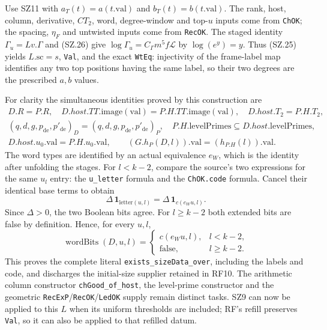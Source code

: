 Use SZ11 with $a_T(t)=a(t.\mathrm{val})$ and
$b_T(t)=b(t.\mathrm{val})$. The rank, host, column, derivative,
$CT_2$, word, degree-window and top-$u$ inputs come from
\texttt{ChOK}; the spacing, $\eta_F$ and untwisted inputs come
from \texttt{RecOK}. The staged identity
$\Gamma_u=Lv.\Gamma$ and (SZ.26) give
$\log\Gamma_u=C_\Gamma m^5f\mathcal L$ by $\log(e^y)=y$.
Thus (SZ.25) yields $L.\mathrm{sc}=s$,
\texttt{Val}, and the exact \texttt{WtEq}: injectivity of the
frame-label map identifies any two top positions having the same
label, so their two degrees are the prescribed $a,b$ values.

For clarity the simultaneous identities proved by this construction
are
\[
 \begin{gathered}
 D.R=P.R,\quad
 D.host.TT.\mathrm{image}(\mathrm{val})
          =P.H.TT.\mathrm{image}(\mathrm{val}),\quad
 D.host.T_2=P.H.T_2,\\
 (q,d,g,p_{\mathrm{de}},p'_{\mathrm{de}})_D
          =(q,d,g,p_{\mathrm{de}},p'_{\mathrm{de}})_P,\quad
 P.H.\mathrm{levelPrimes}\subseteq D.host.\mathrm{levelPrimes},\\
 D.host.u_0.\mathrm{val}=P.H.u_0.\mathrm{val},\qquad
 (G.h_P(D,l)).\mathrm{val}=(h_{P.H}(l)).\mathrm{val}.
 \end{gathered}                                                    \tag{SZ.27}
\]
The word types are identified by an actual equivalence $e_W$, which
is the identity after unfolding the stages. For $l<k-2$, compare
the source's two expressions for the same $u_l$ entry: the
\texttt{u\_letter} formula and the \texttt{ChOK.code} formula.
Cancel their identical base terms to obtain
\[
 \Delta\,\mathbf1_{\mathrm{letter}(u,l)}
             =\Delta\,\mathbf1_{c(e_Wu,l)}.
\]
Since $\Delta>0$, the two Boolean bits agree. For $l\geq k-2$
both extended bits are false by definition. Hence, for every $u,l$,
\[
 \operatorname{wordBits}(D,u,l)=
 \begin{cases}c(e_Wu,l),&l<k-2,\\ \mathrm{false},&l\geq k-2.
 \end{cases}                                                      \tag{SZ.28}
\]
This proves the complete literal \texttt{exists\_sizeData\_over},
including the labels and code, and discharges the initial-size
supplier retained in RF10. The arithmetic column constructor
\texttt{chGood\_of\_host}, the level-prime constructor and the
geometric \texttt{RecExP}/\texttt{RecOK}/\texttt{LedOK} supply
remain distinct tasks. SZ9 can now be applied to this $L$ when its
uniform thresholds are included; RF's refill preserves
\texttt{Val}, so it can also be applied to that refilled datum.

